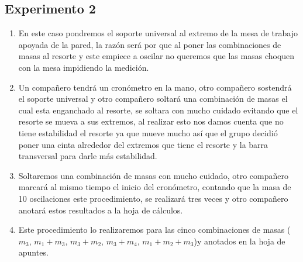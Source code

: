 \documentclass[../main.tex]{subfiles}
\begin{document}
\subsection{Experimento 2}
\begin{enumerate}
    \item En este caso pondremos el soporte universal al extremo 
    de la mesa de trabajo apoyada de la pared, la razón será por 
    que al poner las combinaciones de masas al resorte y este 
    empiece a oscilar no queremos que las masas choquen con la mesa 
    impidiendo la medición.
    \item Un compañero tendrá un cronómetro en la mano, otro 
    compañero sostendrá el soporte universal y otro compañero soltará 
    una combinación de masas el cual esta enganchado al resorte, 
    se soltara con mucho cuidado evitando que el resorte se mueva a 
    sus extremos, al realizar esto nos damos cuenta que no tiene 
    estabilidad el resorte ya que  mueve mucho así que el grupo 
    decidió poner una cinta alrededor del extremos que tiene el 
    resorte y la barra transversal para darle más estabilidad.
    \item Soltaremos una combinación de 
    masas con mucho cuidado, otro compañero marcará al mismo 
    tiempo el inicio del cronómetro, contando que la masa de 10 
    oscilaciones este procedimiento, se realizará tres veces y otro compañero anotará estos resultados a la hoja de cálculos. 
    \item Este procedimiento lo realizaremos para las cinco 
    combinaciones de masas ($m_3$, $m_1+m_3$, $m_3+m_2$, $m_3+m_4$, $m_1+m_2+m_3$)y anotados en la hoja de apuntes.
\end{enumerate}
\end{document}
